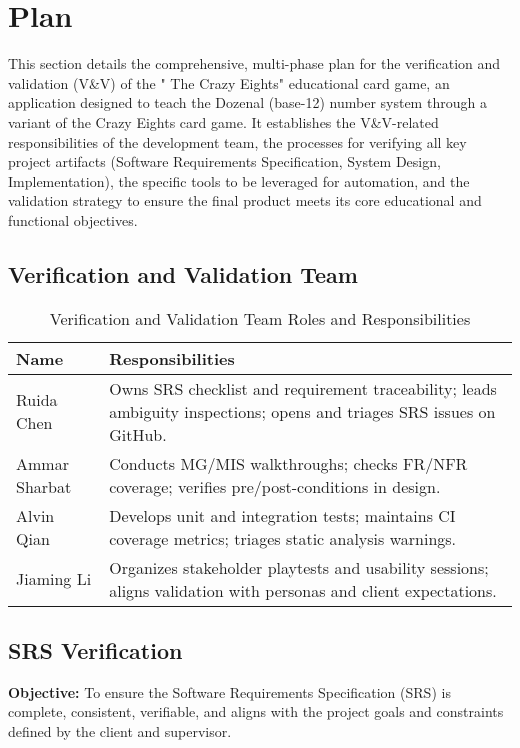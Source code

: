 \documentclass[12pt, titlepage]{article}
\begin{document}
\citet{SRS}


\section{Plan}
This section details the comprehensive, multi-phase plan for the verification and validation (V\&V) of the " The Crazy Eights" educational card game, an application designed to teach the Dozenal (base-12) number system through a variant of the Crazy Eights card game. It establishes the V\&V-related responsibilities of the development team, the processes for verifying all key project artifacts (Software Requirements Specification, System Design, Implementation), the specific tools to be leveraged for automation, and the validation strategy to ensure the final product meets its core educational and functional objectives.   



\subsection{Verification and Validation Team}

\begin{table}[H]
\centering
\caption{Verification and Validation Team Roles and Responsibilities}
\label{tab:vvteam}
\begin{tabularx}{\textwidth}{lX}
\toprule
\textbf{Name} & \textbf{Responsibilities} \\
\midrule
Ruida Chen & Owns SRS checklist and requirement traceability; leads ambiguity inspections; opens and triages SRS issues on GitHub. \\
Ammar Sharbat & Conducts MG/MIS walkthroughs; checks FR/NFR coverage; verifies pre/post-conditions in design. \\
Alvin Qian & Develops unit and integration tests; maintains CI coverage metrics; triages static analysis warnings. \\
Jiaming Li & Organizes stakeholder playtests and usability sessions; aligns validation with personas and client expectations. \\
\bottomrule
\end{tabularx}
\end{table}

\subsection{SRS Verification}
\textbf{Objective:}  
To ensure the Software Requirements Specification (SRS) is complete, consistent, verifiable, and aligns with the project goals and constraints defined by the client and supervisor.
\end{document}

